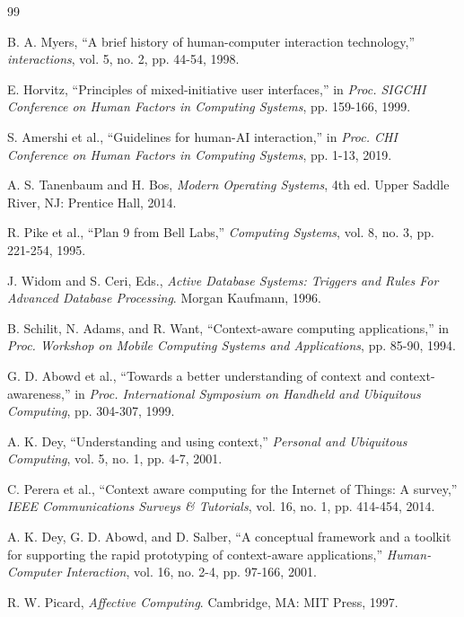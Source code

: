 \documentclass[conference]{IEEEtran}
\begin{document}
\begin{thebibliography}{99}

B. A. Myers, ``A brief history of human-computer interaction technology,'' \textit{interactions}, vol. 5, no. 2, pp. 44-54, 1998.

E. Horvitz, ``Principles of mixed-initiative user interfaces,'' in \textit{Proc. SIGCHI Conference on Human Factors in Computing Systems}, pp. 159-166, 1999.

S. Amershi et al., ``Guidelines for human-AI interaction,'' in \textit{Proc. CHI Conference on Human Factors in Computing Systems}, pp. 1-13, 2019.

A. S. Tanenbaum and H. Bos, \textit{Modern Operating Systems}, 4th ed. Upper Saddle River, NJ: Prentice Hall, 2014.

R. Pike et al., ``Plan 9 from Bell Labs,'' \textit{Computing Systems}, vol. 8, no. 3, pp. 221-254, 1995.

J. Widom and S. Ceri, Eds., \textit{Active Database Systems: Triggers and Rules For Advanced Database Processing}. Morgan Kaufmann, 1996.

B. Schilit, N. Adams, and R. Want, ``Context-aware computing applications,'' in \textit{Proc. Workshop on Mobile Computing Systems and Applications}, pp. 85-90, 1994.

G. D. Abowd et al., ``Towards a better understanding of context and context-awareness,'' in \textit{Proc. International Symposium on Handheld and Ubiquitous Computing}, pp. 304-307, 1999.

A. K. Dey, ``Understanding and using context,'' \textit{Personal and Ubiquitous Computing}, vol. 5, no. 1, pp. 4-7, 2001.

C. Perera et al., ``Context aware computing for the Internet of Things: A survey,'' \textit{IEEE Communications Surveys \& Tutorials}, vol. 16, no. 1, pp. 414-454, 2014.

A. K. Dey, G. D. Abowd, and D. Salber, ``A conceptual framework and a toolkit for supporting the rapid prototyping of context-aware applications,'' \textit{Human-Computer Interaction}, vol. 16, no. 2-4, pp. 97-166, 2001.

R. W. Picard, \textit{Affective Computing}. Cambridge, MA: MIT Press, 1997.


\end{thebibliography}
\end{document}
